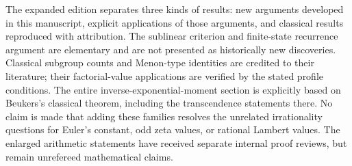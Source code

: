 The expanded edition separates three kinds of results: new arguments
developed in this manuscript, explicit applications of those arguments,
and classical results reproduced with attribution. The sublinear criterion
and finite-state recurrence argument are elementary and are not presented
as historically new discoveries. Classical subgroup counts and Menon-type
identities are credited to their literature; their factorial-value
applications are verified by the stated profile conditions. The entire
inverse-exponential-moment section is explicitly based on Beukers's
classical theorem, including the transcendence statements there.
No claim is made that adding these families resolves the unrelated
irrationality questions for Euler's constant, odd zeta values, or rational
Lambert values. The enlarged arithmetic statements have received separate
internal proof reviews, but remain unrefereed mathematical claims.

